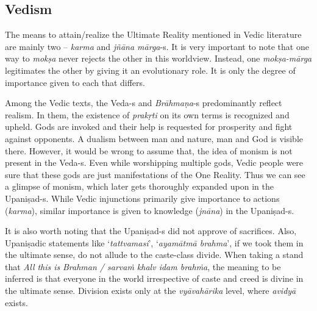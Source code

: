 \subsection*{Vedism}

The means to attain/realize the Ultimate Reality mentioned in Vedic literature are mainly two – \textit{karma} and \textit{jñāna mārga}-s. It is very important to note that one way to \textit{mokṣa} never rejects the other in this worldview. Instead, one \textit{mokṣa-mārga} legitimates the other by giving it an evolutionary role. It is only the degree of importance given to each that differs.

Among the Vedic texts, the Veda-s and \textit{Brāhmaṇa}-s predominantly reflect realism. In them, the existence of \textit{prakṛti} on its own terms is recognized and upheld. Gods are invoked and their help is requested for prosperity and fight against opponents. A dualism between man and nature, man and God is visible there. However, it would be wrong to assume that, the idea of monism is not present in the Veda-s. Even while worshipping multiple gods, Vedic people were sure that these gods are just manifestations of the One Reality. Thus we can see a glimpse of monism, which later gets thoroughly expanded upon in the Upaniṣad-s. While Vedic injunctions primarily give importance to actions (\textit{karma}), similar importance is given to knowledge (\textit{jnāna}) in the Upaniṣad-s.

It is also worth noting that the Upaniṣad-s did not approve of sacrifices. Also, Upaniṣadic statements like ‘\textit{tattvamasi}’, ‘\textit{ayamātmā brahma}’, if we took them in the ultimate sense, do not allude to the caste-class divide. When taking a stand that \textit{All this is} \textit{Brahman / sarvaṁ khalv  idam brahṁa}, the meaning to be inferred is that everyone in the world irrespective of caste and creed is divine in the ultimate sense. Division exists only at the \textit{vyāvahārika} level, where \textit{avidyā} exists.


